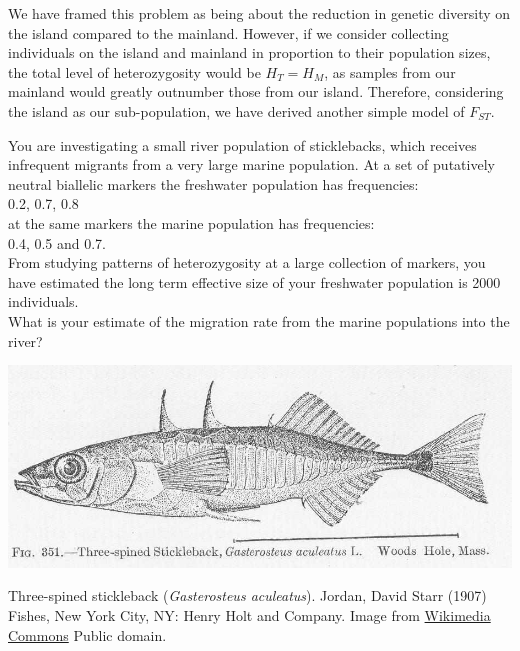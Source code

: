 We have framed this problem as being about the reduction in genetic diversity on the island compared to the mainland. However, if we consider collecting individuals on the island and mainland in proportion to their population
sizes, the total level of heterozygosity would be $H_T=H_M$, as samples from our mainland would greatly outnumber those from our island. Therefore, considering the island as our sub-population, we have derived another simple model of $F_{ST}$.



\begin{question}{}
You are investigating a small river population of sticklebacks, which receives infrequent migrants from a very large marine population. At a set of putatively neutral biallelic markers the freshwater population has frequencies:\\
0.2, 0.7, 0.8\\
at the same markers the marine population has frequencies:\\
0.4, 0.5 and 0.7.\\
 From studying patterns of heterozygosity at a large collection of markers, you have estimated the long term effective size of your freshwater population is 2000 individuals.\\
What is your estimate of the migration rate from the marine
populations into the river?
\end{question}

\begin{marginfigure}
\begin{center}
\includegraphics[width=\textwidth]{illustration_images/Genetic_drift/stickleback/threespine.jpg}
\end{center}
\caption{Three-spined stickleback ({\it Gasterosteus aculeatus}).
  \newline \noindent \tiny{Jordan, David Starr (1907) Fishes, New York City, NY: Henry Holt and Company. Image from  \href{https://commons.wikimedia.org/wiki/File:FMIB_51889_Three-spined_Stickleback,_Gasterosteus_aculeatus_L_Woods_Hole,_Mass.jpeg}{Wikimedia Commons} Public domain.}} \label{fig:stickle}
\end{marginfigure}

